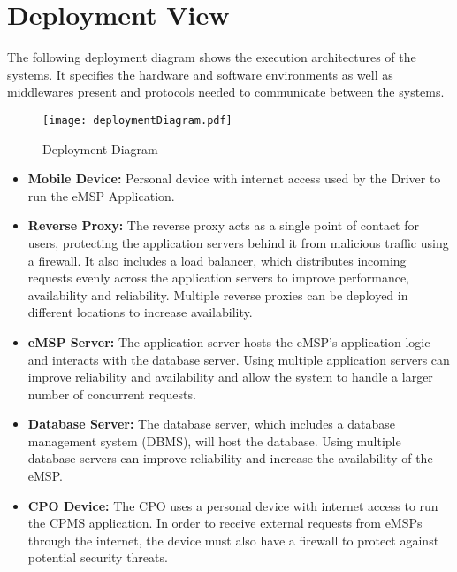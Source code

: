 \section{Deployment View}
\label{sec:deploymentView}
The following deployment diagram shows the execution architectures of the systems. It specifies the hardware and software environments as well as middlewares present and protocols needed to communicate between the systems.
\begin{figure}[H]
            \begin{center}
            \texttt{[image: deploymentDiagram.pdf]}
            \caption{Deployment Diagram}
            \label{fig:DeploymentDiagram}
            \end{center}
        \end{figure}
\begin{itemize}
    \item \textbf{Mobile Device: }Personal device with internet access used by the Driver to run the eMSP Application.
    \item \textbf{Reverse Proxy: }The reverse proxy acts as a single point of contact for users, protecting the application servers behind it from malicious traffic using a firewall. It also includes a load balancer, which distributes incoming requests evenly across the application servers to improve performance, availability and reliability. Multiple reverse proxies can be deployed in different locations to increase availability.
    \item \textbf{eMSP Server: }The application server hosts the eMSP's application logic and interacts with the database server. Using multiple application servers can improve reliability and availability and allow the system to handle a larger number of concurrent requests.
    \item \textbf{Database Server: }The database server, which includes a database management system (DBMS), will host the database. Using multiple database servers can improve reliability and increase the availability of the eMSP.
    \item \textbf{CPO Device: }The CPO uses a personal device with internet access to run the CPMS application. In order to receive external requests from eMSPs through the internet, the device must also have a firewall to protect against potential security threats.
    
\end{itemize}
